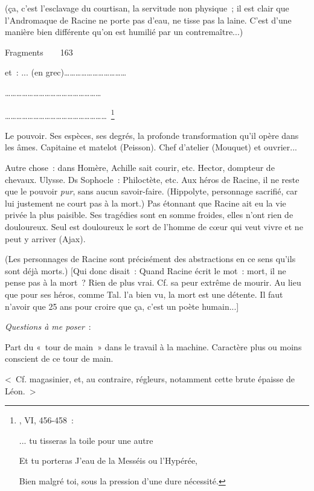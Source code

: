 \documentclass[french,twoside]{book} %
\begin{document}
\noindent (ça, c'est l'esclavage du courtisan, la servitude non physique ; il est clair que l'Andromaque de Racine ne porte pas d'eau, ne tisse pas la laine. C'est d'une manière bien différente qu'on est humilié par un contremaître...)\par
Fragments    163\par
et : ... (en grec)……………………………\par
……………………………………………\par
……………………………………………… \footnote{, VI, 456-458 :\par
... tu tisseras la toile pour une autre\par
Et tu porteras J'eau de la Messéis ou l'Hypérée,\par
Bien malgré toi, sous la pression d'une dure nécessité.
}\par
Le pouvoir. Ses espèces, ses degrés, la profonde transformation qu'il opère dans les âmes. Capitaine et matelot (Peisson). Chef d'atelier (Mouquet) et ouvrier...\par
Autre chose : dans Homère, Achille sait courir, etc. Hector, dompteur de chevaux. Ulysse. Ds Sophocle : Philoctète, etc. Aux héros de Racine, il ne reste que le pouvoir {\itshape pur}, sans aucun savoir-faire. (Hippolyte, personnage sacrifié, car lui justement ne court pas à la mort.) Pas étonnant que Racine ait eu la vie privée la plus paisible. Ses tragédies sont en somme froides, elles n'ont rien de douloureux. Seul est douloureux le sort de l'homme de cœur qui veut vivre et ne peut y arriver (Ajax).\par
(Les personnages de Racine sont précisément des abstractions en ce sens qu'ils sont déjà morts.) [Qui donc disait : Quand Racine écrit le mot : mort, il ne pense pas à la mort ? Rien de plus vrai. Cf. sa peur extrême de mourir. Au lieu que pour ses héros, comme Tal. l'a bien vu, la mort est une détente. Il faut n'avoir que 25 ans pour croire que ça, c'est un poète humain...]\par
{\itshape Questions à me poser} :\par
Part du « tour de main » dans le travail à la machine. Caractère plus ou moins conscient de ce tour de main.\par
< Cf. magasinier, et, au contraire, régleurs, notamment cette brute épaisse de Léon. >\par
\end{document}
